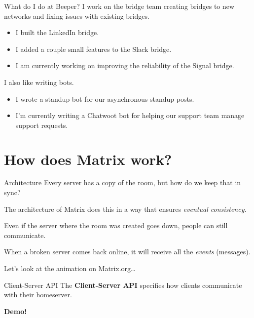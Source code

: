 \documentclass{acm}
\begin{document}
\begin{frame}{What do I do at Beeper?}
    I work on the bridge team creating bridges to new networks and fixing issues
    with existing bridges.

    \begin{itemize}
        \item I built the LinkedIn bridge.
        \item I added a couple small features to the Slack bridge.
        \item I am currently working on improving the reliability of the Signal
            bridge.
    \end{itemize}
    \pause

    I also like writing bots.

    \begin{itemize}
        \item I wrote a standup bot for our asynchronous standup posts.
        \item I'm currently writing a Chatwoot bot for helping our support team
            manage support requests.
    \end{itemize}
\end{frame}

\section{How does Matrix work?}

\begin{frame}{Architecture}
    Every server has a copy of the room, but how do we keep that in sync?
    \pause

    The architecture of Matrix does this in a way that ensures \textit{eventual
    consistency}.
    \pause

    Even if the server where the room was created goes down, people can still
    communicate.

    When a broken server comes back online, it will receive all the
    \textit{events} (messages).
    \pause

    Let's look at the animation on Matrix.org\ldots
\end{frame}

\begin{frame}[fragile]{Client-Server API}
    The \textbf{Client-Server API} specifies how clients communicate with their
    homeserver.
    \pause
    \vspace{1in}

    \Huge
    \textbf{Demo!}
\end{frame}
\end{document}
